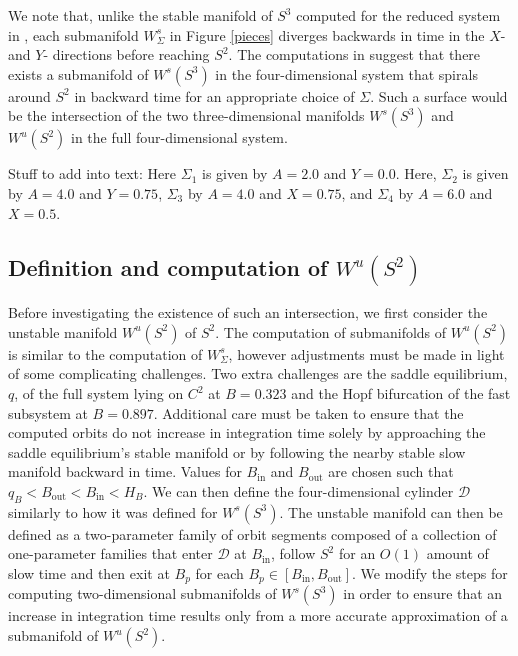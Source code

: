 \documentclass{ws-ijbc}
\begin{document}
We note that, unlike the stable manifold of $S^3$ computed for the reduced system in \cite{QSSA}, each submanifold $W^{s}_{\Sigma}$ in Figure \ref{pieces} diverges backwards in time in the $X$- and $Y$- directions before reaching $S^2$.  The computations in \cite{QSSA} suggest that there exists a  submanifold of $W^s(S^3)$ in the four-dimensional system that spirals around $S^2$ in backward time for an appropriate choice of $\Sigma$.  Such a surface would be the intersection of the two three-dimensional manifolds $W^s(S^3)$ and $W^u(S^2)$ in the full four-dimensional system.  


Stuff to add into text:
Here $\Sigma_1$ is given by $A=2.0$ and $Y=0.0$.
Here, $\Sigma_2$ is given by $A=4.0$ and $Y=0.75$, $\Sigma_3$ by $A=4.0$ and $X=0.75$, and $\Sigma_4$ by $A=6.0$ and $X=0.5$.


\subsection{Definition and computation of $W^{u}(S^2)$}  

Before investigating the existence of such an intersection, we first consider the unstable manifold $W^{u}(S^2)$ of $S^2$.  The computation of submanifolds of $W^{u}(S^2)$ is similar to the computation of $W^{s}_\Sigma$, however adjustments must be made in light of some complicating challenges.  Two extra challenges are the saddle equilibrium, $q$, of the full system lying on $C^2$ at $B = 0.323$ and the Hopf bifurcation of the fast subsystem at $B = 0.897$.  Additional care must be taken to ensure that the computed orbits do not increase in integration time solely by approaching the saddle equilibrium's stable manifold or by following the nearby stable slow manifold backward in time.  Values for $B_{\mathrm{in}}$ and $B_{\mathrm{out}}$ are chosen such that $q_B < B_{\mathrm{out}} < B_{\mathrm{in}}< H_B$.  We can then define the four-dimensional cylinder $\mathscr{D}$ similarly to how it was defined for $W^s(S^3)$.  The unstable manifold can then be defined as a two-parameter family of orbit segments composed of a collection of one-parameter families that enter $\mathscr{D}$ at $B_{\mathrm{in}}$, follow $S^2$ for an $O(1)$ amount of slow time and then exit at $B_p$ for each $B_p \in [B_{\mathrm{in}}, B_{\mathrm{out}}]$.  We modify the steps for computing two-dimensional submanifolds of $W^s(S^3)$ in order to ensure that an increase in integration time results only from a more accurate approximation of a submanifold of $W^u(S^2)$.
\end{document}
